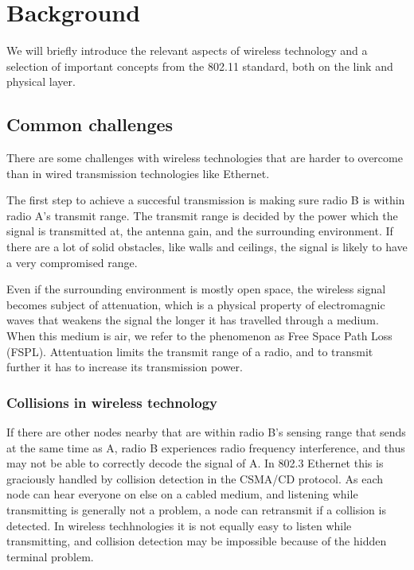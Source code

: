 \chapter{Background}
We will briefly introduce the relevant aspects of wireless technology and a selection of important
concepts from the 802.11 standard, both on the link and physical layer.

\section{Common challenges}
There are some challenges with wireless technologies that are harder to overcome than in wired transmission technologies like Ethernet.

The first step to achieve a succesful transmission is making sure radio B is within radio A's transmit range. The
transmit range is decided by the power which the signal is transmitted at, the antenna gain, and the surrounding 
environment. If there are a lot of solid obstacles, like walls and ceilings, the signal is likely to have a very compromised range.

Even if the surrounding environment is mostly open space, the wireless signal becomes subject of attenuation,
     which is a physical property of electromagnic waves that weakens the signal the longer it has travelled through a
     medium. When this medium is air, we refer to the phenomenon as Free Space Path Loss (FSPL). Attentuation limits
     the transmit range of a radio, and to transmit further it has to increase its transmission power.

     \subsection{Collisions in wireless technology}
     If there are other nodes nearby that are within radio B's sensing range that sends at the same time as A, 
     radio B experiences radio frequency interference, and thus may not be able to correctly decode the signal of A. In 802.3 Ethernet this
     is graciously handled by collision detection in the CSMA/CD protocol. As each node can hear everyone on else on a cabled medium,
     and listening while transmitting is generally not a problem, a node can retransmit if a collision is detected. In wireless techhnologies
     it is not equally easy to listen while transmitting, and collision detection may be impossible because of the hidden terminal problem.

